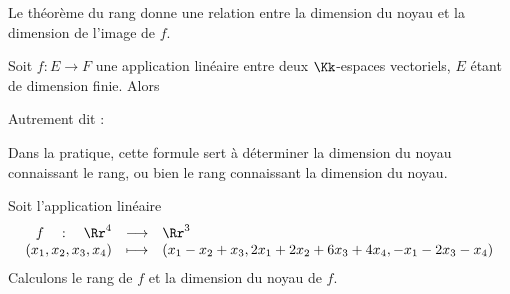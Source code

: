 \documentclass[class=report,crop=false]{standalone}
\begin{document}
Le théorème du rang donne une relation entre la
dimension du noyau et la dimension de l'image de $f$.
\begin{theoreme}
Soit $f : E \to F$ une application linéaire entre deux $\Kk$-espaces vectoriels,
$E$ étant de dimension finie.
Alors
\end{theoreme}

Autrement dit : 

Dans la pratique, cette formule sert à déterminer la dimension du noyau
connaissant le rang, ou bien le rang connaissant la dimension du noyau.


\begin{exemple}
Soit l'application linéaire
$$\begin{array}{rcl}
f \quad : \quad \Rr^4 &\longrightarrow&  \Rr^3 \\
        (x_1,x_2,x_3,x_4) &\longmapsto& (x_1-x_2+x_3,2x_1+2x_2+6x_3+4x_4,-x_1-2x_3-x_4)
  \end{array}$$
Calculons le rang de $f$ et la dimension du noyau de $f$.




\end{exemple}
\end{document}

